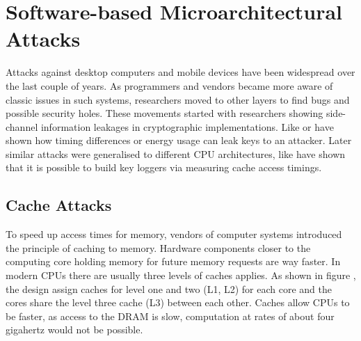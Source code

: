 
\section{Software-based Microarchitectural Attacks}

Attacks against desktop computers and mobile devices have been widespread over
the last couple of years. As programmers and vendors became more aware of
classic issues in such systems, researchers moved to other layers to find bugs
and possible security holes. These movements started with researchers showing
side-channel information leakages in cryptographic implementations. Like
 or  have shown how timing differences or energy usage can leak keys to an
attacker. Later similar attacks were generalised to different CPU architectures,
like  have shown that it is possible to
build key loggers via measuring cache access timings.

\subsection{Cache Attacks}

To speed up access times for memory, vendors of computer systems introduced the
principle of caching  to memory. Hardware
components closer to the computing core holding memory for future memory
requests are way faster. In modern CPUs  there are usually three levels of caches applies. As shown in figure
, the design assign caches for level one and two
(L1, L2) for each core and the cores share the level three cache (L3) between
each other. Caches allow CPUs to be faster, as access to the DRAM is slow,
computation at rates of about four gigahertz would not be possible.

